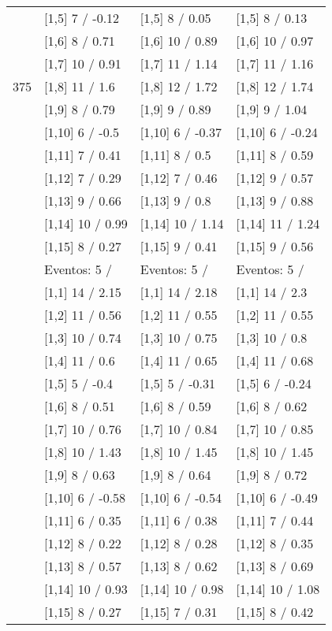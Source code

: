 \begin{table}
\begin{tabular}[t]{llll}
 & {}[1,5] 7  / -0.12 & {}[1,5] 8  / 0.05 & {}[1,5] 8  / 0.13\\
 & {}[1,6] 8  / 0.71 & {}[1,6] 10  / 0.89 & {}[1,6] 10  / 0.97\\
 & {}[1,7] 10  / 0.91 & {}[1,7] 11  / 1.14 & {}[1,7] 11  / 1.16\\
375 & {}[1,8] 11  / 1.6 & {}[1,8] 12  / 1.72 & {}[1,8] 12  / 1.74\\
\addlinespace
 & {}[1,9] 8  / 0.79 & {}[1,9] 9  / 0.89 & {}[1,9] 9  / 1.04\\
 & {}[1,10] 6  / -0.5 & {}[1,10] 6  / -0.37 & {}[1,10] 6  / -0.24\\
 & {}[1,11] 7  / 0.41 & {}[1,11] 8  / 0.5 & {}[1,11] 8  / 0.59\\
 & {}[1,12] 7  / 0.29 & {}[1,12] 7  / 0.46 & {}[1,12] 9  / 0.57\\
 & {}[1,13] 9  / 0.66 & {}[1,13] 9  / 0.8 & {}[1,13] 9  / 0.88\\
\addlinespace
 & {}[1,14] 10  / 0.99 & {}[1,14] 10  / 1.14 & {}[1,14] 11  / 1.24\\
 & {}[1,15] 8  / 0.27 & {}[1,15] 9  / 0.41 & {}[1,15] 9  / 0.56\\
 & Eventos:  5 / & Eventos:  5 / & Eventos:  5 /\\
 & {}[1,1] 14  / 2.15 & {}[1,1] 14  / 2.18 & {}[1,1] 14  / 2.3\\
 & {}[1,2] 11  / 0.56 & {}[1,2] 11  / 0.55 & {}[1,2] 11  / 0.55\\
\addlinespace
 & {}[1,3] 10  / 0.74 & {}[1,3] 10  / 0.75 & {}[1,3] 10  / 0.8\\
 & {}[1,4] 11  / 0.6 & {}[1,4] 11  / 0.65 & {}[1,4] 11  / 0.68\\
 & {}[1,5] 5  / -0.4 & {}[1,5] 5  / -0.31 & {}[1,5] 6  / -0.24\\
 & {}[1,6] 8  / 0.51 & {}[1,6] 8  / 0.59 & {}[1,6] 8  / 0.62\\
 & {}[1,7] 10  / 0.76 & {}[1,7] 10  / 0.84 & {}[1,7] 10  / 0.85\\
\addlinespace
500 & {}[1,8] 10  / 1.43 & {}[1,8] 10  / 1.45 & {}[1,8] 10  / 1.45\\
 & {}[1,9] 8  / 0.63 & {}[1,9] 8  / 0.64 & {}[1,9] 8  / 0.72\\
 & {}[1,10] 6  / -0.58 & {}[1,10] 6  / -0.54 & {}[1,10] 6  / -0.49\\
 & {}[1,11] 6  / 0.35 & {}[1,11] 6  / 0.38 & {}[1,11] 7  / 0.44\\
 & {}[1,12] 8  / 0.22 & {}[1,12] 8  / 0.28 & {}[1,12] 8  / 0.35\\
\addlinespace
 & {}[1,13] 8  / 0.57 & {}[1,13] 8  / 0.62 & {}[1,13] 8  / 0.69\\
 & {}[1,14] 10  / 0.93 & {}[1,14] 10  / 0.98 & {}[1,14] 10  / 1.08\\
 & {}[1,15] 8  / 0.27 & {}[1,15] 7  / 0.31 & {}[1,15] 8  / 0.42\\
\bottomrule
\end{tabular}
\end{table}

